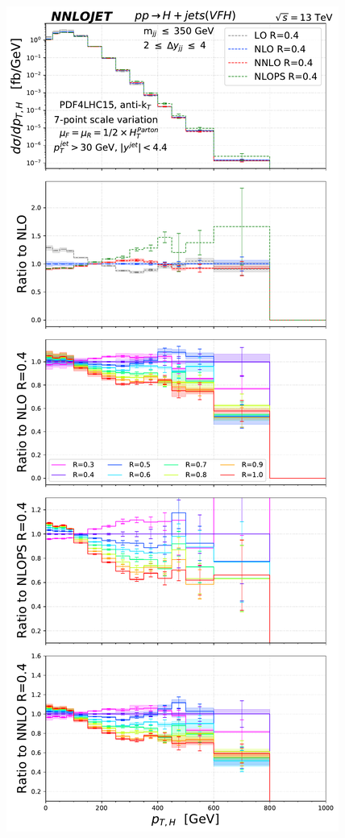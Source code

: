 \documentclass[10pt,prd,fleqn,superscriptaddress,notitlepage,nofootinbib,preprintnumbers,nobalancelastpage]{revtex4-1}
\begin{document}
\begin{figure}[t]
\includegraphics[scale=0.3]{figures/rdep/LH19VFH_pth_largebin_light_middle.pdf}

\end{figure}
\end{document}
